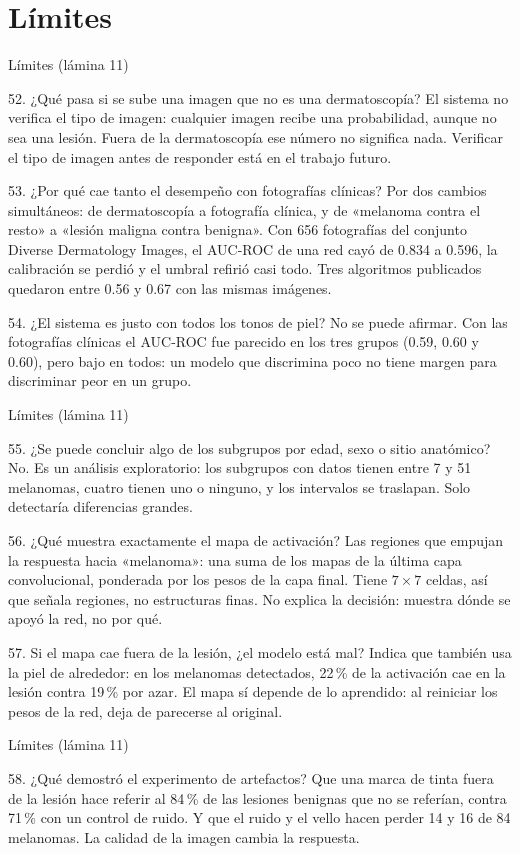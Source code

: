 \documentclass[aspectratio=169,10pt]{beamer}
\newcommand{\qa}[2]{\begin{block}{#1}\footnotesize #2\end{block}}
\begin{document}
\section{Límites}
\begin{frame}{Límites (lámina 11)}
  \qa{52. ¿Qué pasa si se sube una imagen que no es una dermatoscopía?}{
    El sistema no verifica el tipo de imagen: cualquier imagen recibe una probabilidad, aunque no sea una lesión. Fuera de la dermatoscopía ese número no significa nada. Verificar el tipo de imagen antes de responder está en el trabajo futuro.}
  \qa{53. ¿Por qué cae tanto el desempeño con fotografías clínicas?}{
    Por dos cambios simultáneos: de dermatoscopía a fotografía clínica, y de «melanoma contra el resto» a «lesión maligna contra benigna». Con 656 fotografías del conjunto Diverse Dermatology Images, el AUC-ROC de una red cayó de 0.834 a 0.596, la calibración se perdió y el umbral refirió casi todo. Tres algoritmos publicados quedaron entre 0.56 y 0.67 con las mismas imágenes.}
  \qa{54. ¿El sistema es justo con todos los tonos de piel?}{
    No se puede afirmar. Con las fotografías clínicas el AUC-ROC fue parecido en los tres grupos (0.59, 0.60 y 0.60), pero bajo en todos: un modelo que discrimina poco no tiene margen para discriminar peor en un grupo.}
\end{frame}

\begin{frame}{Límites (lámina 11)}
  \qa{55. ¿Se puede concluir algo de los subgrupos por edad, sexo o sitio anatómico?}{
    No. Es un análisis exploratorio: los subgrupos con datos tienen entre 7 y 51 melanomas, cuatro tienen uno o ninguno, y los intervalos se traslapan. Solo detectaría diferencias grandes.}
  \qa{56. ¿Qué muestra exactamente el mapa de activación?}{
    Las regiones que empujan la respuesta hacia «melanoma»: una suma de los mapas de la última capa convolucional, ponderada por los pesos de la capa final. Tiene $7 \times 7$ celdas, así que señala regiones, no estructuras finas. No explica la decisión: muestra dónde se apoyó la red, no por qué.}
  \qa{57. Si el mapa cae fuera de la lesión, ¿el modelo está mal?}{
    Indica que también usa la piel de alrededor: en los melanomas detectados, 22\,\% de la activación cae en la lesión contra 19\,\% por azar. El mapa sí depende de lo aprendido: al reiniciar los pesos de la red, deja de parecerse al original.}
\end{frame}

\begin{frame}{Límites (lámina 11)}
  \qa{58. ¿Qué demostró el experimento de artefactos?}{
    Que una marca de tinta fuera de la lesión hace referir al 84\,\% de las lesiones benignas que no se referían, contra 71\,\% con un control de ruido. Y que el ruido y el vello hacen perder 14 y 16 de 84 melanomas. La calidad de la imagen cambia la respuesta.}
\end{frame}
\end{document}
